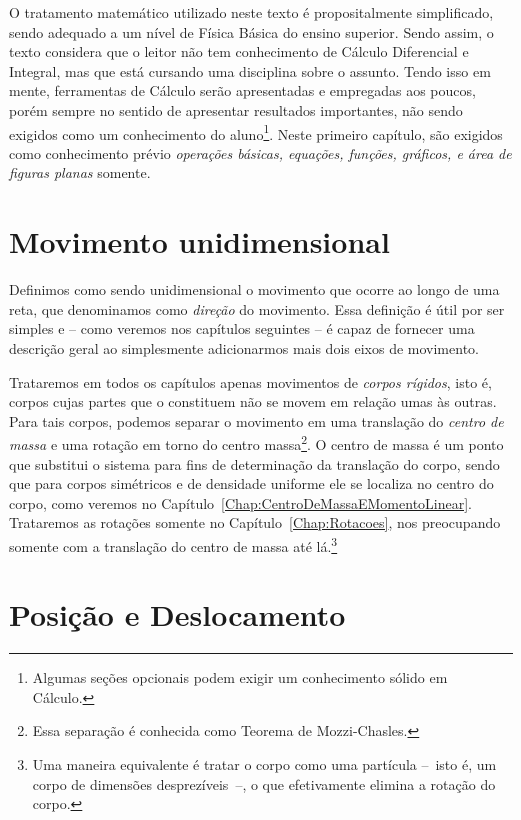 O tratamento matemático utilizado neste texto é propositalmente simplificado, sendo adequado a um nível de Física Básica do ensino superior. Sendo assim, o texto considera que o leitor não tem conhecimento de Cálculo Diferencial e Integral, mas que está cursando uma disciplina sobre o assunto. Tendo isso em mente, ferramentas de Cálculo serão apresentadas e empregadas aos poucos, porém sempre no sentido de apresentar resultados importantes, não sendo exigidos como um conhecimento do aluno\footnote{Algumas seções opcionais podem exigir um conhecimento sólido em Cálculo.}. Neste primeiro capítulo, são exigidos como conhecimento prévio \emph{operações básicas, equações, funções, gráficos, e área de figuras planas} somente.

\section{Movimento unidimensional}

Definimos como sendo unidimensional o movimento que ocorre ao longo de uma reta, que denominamos como \emph{direção} do movimento. Essa definição é útil por ser simples e -- como veremos nos capítulos seguintes -- é capaz de fornecer uma descrição geral ao simplesmente adicionarmos mais dois eixos de movimento.

Trataremos em todos os capítulos apenas movimentos de \emph{corpos rígidos}, isto é, corpos cujas partes que o constituem não se movem em relação umas às outras. Para tais corpos, podemos separar o movimento em uma translação do \emph{centro de massa} e uma rotação em torno do centro massa\footnote[][-2cm]{Essa separação é conhecida como Teorema de Mozzi-Chasles.}. O centro de massa é um ponto que substitui o sistema para fins de determinação da translação do corpo, sendo que para corpos simétricos e de densidade uniforme ele se localiza no centro do corpo, como veremos no Capítulo~\ref{Chap:CentroDeMassaEMomentoLinear}. Trataremos as rotações somente no Capítulo~\ref{Chap:Rotacoes}, nos preocupando somente com a translação do centro de massa até lá.\footnote[][-3cm]{Uma maneira equivalente é tratar o corpo como uma partícula --~isto é, um corpo de dimensões desprezíveis~--, o que efetivamente elimina a rotação do corpo.}

\section{Posição e Deslocamento}

